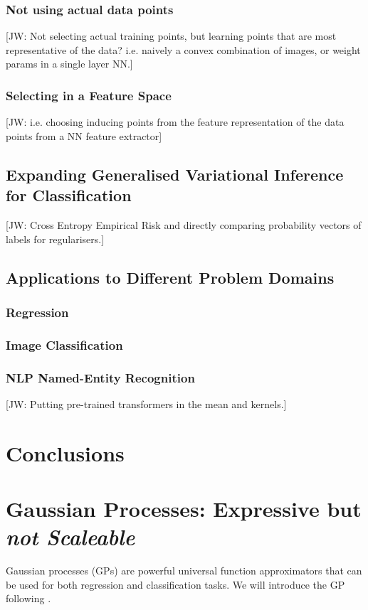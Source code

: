 \documentclass{article}
\newcommand{\jw}[1]{{\color{gray} [JW: #1]}}
\numberwithin{equation}{section}
\begin{document}
\subsubsection{Not using actual data points}
\jw{Not selecting actual training points, but learning points that are most representative of the data? i.e. naively a convex combination of images, or weight params in a single layer NN.}
\subsubsection{Selecting in a Feature Space}
\jw{i.e. choosing inducing points from the feature representation of the data points from a NN feature extractor}

\subsection{Expanding Generalised Variational Inference for Classification}

\jw{Cross Entropy Empirical Risk and directly comparing probability vectors of labels for regularisers.}


\subsection{Applications to Different Problem Domains}

\subsubsection{Regression}

\subsubsection{Image Classification}


\subsubsection{NLP Named-Entity Recognition}
\jw{Putting pre-trained transformers in the mean and kernels.} 



\newpage
\section{Conclusions}


\newpage
\section{Gaussian Processes: Expressive but \textit{not Scaleable}}
Gaussian processes (GPs) are powerful universal function approximators that can be used for both regression and classification tasks. We will introduce the GP following \cite{rasmussen2003gaussian}.
\end{document}
